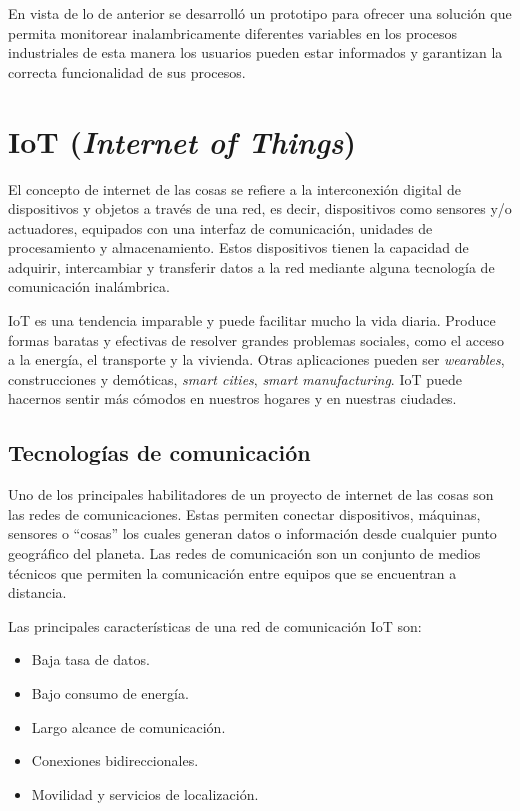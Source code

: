 En vista de lo de anterior se desarrolló un prototipo para ofrecer una solución que permita monitorear inalambricamente diferentes variables en los procesos industriales de esta manera los usuarios pueden estar informados y garantizan la correcta funcionalidad de sus procesos.



\section{IoT (\textit{Internet of Things})}
El concepto de internet de las cosas se refiere a la interconexión digital de dispositivos y objetos  a través  de una red, es decir, dispositivos como sensores y/o actuadores, equipados con una interfaz de comunicación, unidades de procesamiento y almacenamiento\citep{centenaro2016long}. Estos dispositivos tienen la capacidad de adquirir, intercambiar y transferir datos a la red mediante alguna tecnología de comunicación inalámbrica.



IoT es una tendencia imparable y puede facilitar mucho la vida diaria. Produce formas baratas y efectivas de resolver grandes problemas sociales, como el acceso a la energía, el transporte y la vivienda. Otras aplicaciones pueden ser \textit{wearables}, construcciones y demóticas, \textit{smart cities}, \textit{smart manufacturing}\citep{taylor2015world}. IoT puede hacernos sentir más cómodos en nuestros hogares y en nuestras ciudades.

\subsection{Tecnologías de comunicación}
Uno de los principales habilitadores de un proyecto de internet de las cosas son las redes de comunicaciones. Estas permiten conectar dispositivos, máquinas, sensores o “cosas” los cuales generan datos o información desde cualquier punto geográfico del planeta. Las redes de comunicación son un conjunto de medios técnicos que permiten la comunicación entre equipos que se encuentran a distancia.

Las principales características de una red de comunicación IoT son:
\begin{itemize}
	\item Baja tasa de datos.
	\item Bajo consumo de energía.
	\item Largo alcance de comunicación.
	\item Conexiones bidireccionales.
	\item Movilidad y servicios de localización.

\end{itemize}

